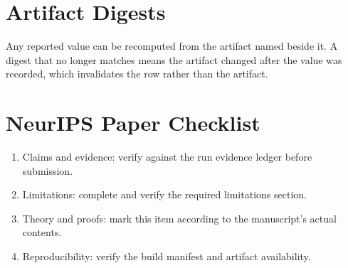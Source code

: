 \documentclass{article}
\begin{document}
\section{Artifact Digests}
\begin{table}[htbp]
\centering
{}
\end{table}

Any reported value can be recomputed from the artifact named beside it. A digest that no longer matches means the artifact changed after the value was recorded, which invalidates the row rather than the artifact.







\section*{NeurIPS Paper Checklist}
\begin{enumerate}
  \item Claims and evidence: verify against the run evidence ledger before submission.
  \item Limitations: complete and verify the required limitations section.
  \item Theory and proofs: mark this item according to the manuscript's actual contents.
  \item Reproducibility: verify the build manifest and artifact availability.
\end{enumerate}
\end{document}

